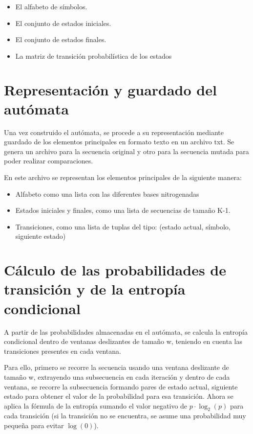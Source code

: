 \documentclass[11pt,spanish,listoffigures,listoftables]{tfgetsinf}
\begin{document}
\begin{itemize}
   \item El alfabeto de símbolos.
   \item El conjunto de estados iniciales.  
   \item El conjunto de estados finales. 
   \item La matriz de transición probabilística de los estados 
\end{itemize}

\section{Representación y guardado del autómata}

Una vez construido el autómata, se procede a su representación mediante guardado de los elementos principales en formato texto en un archivo txt. Se genera un archivo para la secuencia original y otro para la secuencia mutada para poder realizar comparaciones. 

En este archivo se representan los elementos principales de la siguiente manera: 

\begin{itemize}
   \item Alfabeto como una lista con las diferentes bases nitrogenadas 
   \item Estados iniciales y finales, como una lista de secuencias de tamaño K-1.
   \item Transiciones, como una lista de tuplas del tipo: (estado actual, símbolo, siguiente estado)
\end{itemize}


\section{Cálculo de las probabilidades de transición y de la entropía condicional}

A partir de las probabilidades almacenadas en el autómata, se calcula la entropía condicional dentro de ventanas deslizantes de tamaño w, teniendo en cuenta las transiciones presentes en cada ventana. 

Para ello, primero se recorre la secuencia usando una ventana deslizante de tamaño w, extrayendo una subsecuencia en cada iteración y dentro de cada ventana, se recorre la subsecuencia formando pares de estado actual, siguiente estado para obtener el valor de la probabilidad para esa transición. Ahora se aplica la fórmula de la entropía sumando el valor negativo de $p \cdot \log_2(p)$ para cada transición (si la transición no se encuentra, se asume una probabilidad muy pequeña para evitar $\log(0)$).
\end{document}
